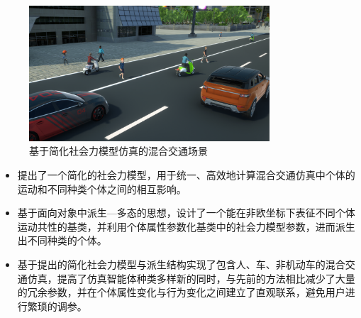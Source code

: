 \begin{figure}[!t]
\centering
\includegraphics[width=0.8\textwidth]{figure/simplified/simplified_snapshot9.png}
\caption[基于简化社会力模型仿真的混合交通场景]{
基于简化社会力模型仿真的混合交通场景
}
\label{fig:simplified_snapshot}
\end{figure}

\begin{itemize}



    \item 提出了一个简化的社会力模型，用于统一、高效地计算混合交通仿真中个体的运动和不同种类个体之间的相互影响。


    \item 基于面向对象中派生—多态的思想，设计了一个能在非欧坐标下表征不同个体运动共性的基类，并利用个体属性参数化基类中的社会力模型参数，进而派生出不同种类的个体。

    \item 基于提出的简化社会力模型与派生结构实现了包含人、车、非机动车的混合交通仿真，提高了仿真智能体种类多样新的同时，与先前的方法相比减少了大量的冗余参数，并在个体属性变化与行为变化之间建立了直观联系，避免用户进行繁琐的调参。
    
\end{itemize}





